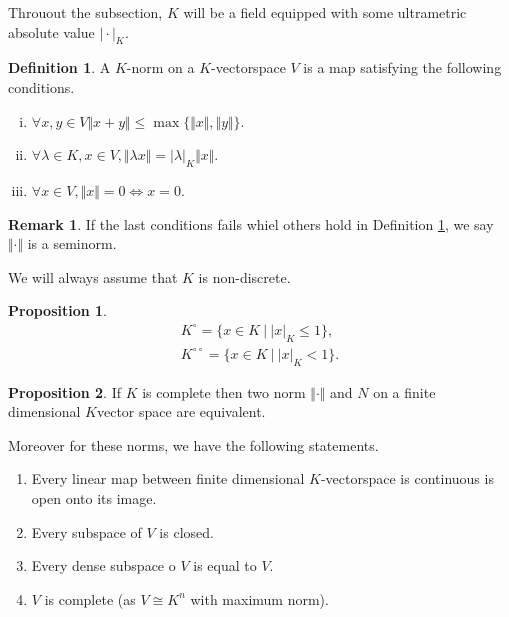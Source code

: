\documentclass[10pt]{article}
\numberwithin{equation}{section}
\theoremstyle{definition}
\newtheorem{proposition}{Proposition}[subsection]
\newtheorem{definition}{Definition}[subsection]
\newtheorem{remark}{Remark}[subsection]
\newcommand{\norm}[1]{\Vert #1 \Vert}
\newcommand{\sep}[0]{\:|\:}
\newcommand{\ab}[1]{\vert #1 \vert}
\newcommand{\dcirc}[0]{{\circ\circ}}
\begin{document}
Throuout the subsection, $K$ will be a field equipped with some ultrametric absolute value $\ab{\cdot}_K$.

\begin{definition}
    \label{definition_28_1}
    A $K$-norm on a $K$-vectorspace $V$ is a map satisfying the following conditions.
    \begin{enumerate}[i.]
        \item $\forall x,y\in V\norm{x+y}\leq \max\{\norm{x},\norm{y}\}$.
        \item $\forall \lambda\in K,x\in V,\norm{\lambda x} = \ab{\lambda}_K\norm{x}$. 
        \item $\forall x\in V,\norm{x}=0\iff x=0$. 
    \end{enumerate}
\end{definition}

\begin{remark}
    If the last conditions fails whiel others hold in Definition \ref{definition_28_1}, we say $\norm{\cdot}$ is a seminorm.
\end{remark}

We will always assume that $K$ is non-discrete.

\begin{proposition}
    \label{fact_28_1}
    \begin{align*}
        K^\circ = \{x\in K\sep \ab{x}_K\leq 1\},\\
        K^\dcirc = \{x\in K\sep \ab{x}_K<1\}.
    \end{align*}
\end{proposition}

\begin{proposition}
    \label{proposition_28_1}
    If $K$ is complete then two norm $\norm{\cdot}$ and $N$ on a finite dimensional $K$vector space are equivalent.
    \par Moreover for these norms, we have the following statements.
    \begin{enumerate}
        \item Every linear map between finite dimensional $K$-vectorspace is continuous is open onto its image.
        \item Every subspace of $V$ is closed.
        \item Every dense subspace o $V$ is equal to $V$.
        \item $V$ is complete (as $V\cong K^n$ with maximum norm).
    \end{enumerate}
\end{proposition}
\end{document}

